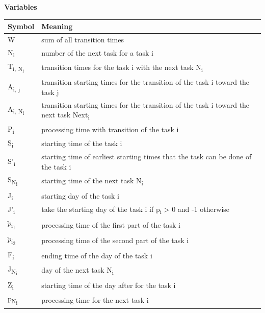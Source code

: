 \documentclass[fleqn,10pt]{wlscirep}
\begin{document}
\noindent \textbf{Variables}

\begin{table}[ht]
\centering
\begin{tabular}{|l|l|}
\hline
Symbol & Meaning \\
\hline
W & sum of all transition times \\%
\hline
N\textsubscript{i} & number of the next task for a task i  \\%
\hline
T\textsubscript{i, N\textsubscript{i}} & transition times for the task i with the next task N\textsubscript{i} \\%
\hline
A\textsubscript{i, j} & transition starting times for the transition of the task i toward the task j  \\ %
\hline
A\textsubscript{i, N\textsubscript{i}} & transition starting times for the transition of the task i toward the next task Next\textsubscript{i}  \\ %
\hline
P\textsubscript{i} & processing time with transition of the task i  \\%
\hline
S\textsubscript{i} & starting time of the task i  \\%
\hline
S'\textsubscript{i} & starting time of earliest starting times that the task can be done of the task i  \\
\hline
S\textsubscript{N\textsubscript{i}} & starting time of the next task N\textsubscript{i}  \\
\hline
J\textsubscript{i} & starting day of the task i  \\ %
\hline
J'\textsubscript{i} & take the starting day of the task i if p\textsubscript{i} > 0 and -1 otherwise \\
\hline
$\tilde{p}$\textsubscript{i\textsubscript{1}}  & processing time of the first part of the task i \\
\hline
$\tilde{p}$\textsubscript{i\textsubscript{2}}  & processing time of the second part of the task i \\
\hline
F\textsubscript{i}  & ending time of the day of the task i \\
\hline
J\textsubscript{N\textsubscript{i}}  & day of the next task N\textsubscript{i} \\
\hline
Z\textsubscript{i}  & starting time of the day after for the task i \\
\hline
p\textsubscript{N\textsubscript{i}}  & processing time for the next task i \\

\end{tabular}
\end{table}
\end{document}
